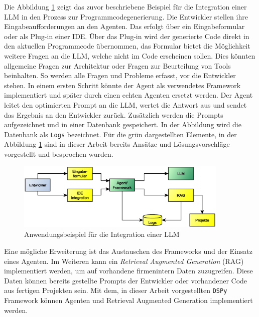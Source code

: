 Die Abbildung \ref{img:example_firm_integration} zeigt das zuvor beschriebene Beispiel für die Integration einer LLM in den Prozess zur Programmcodegenerierung. Die Entwickler stellen ihre Eingabeaufforderungen an den Agenten. Das erfolgt über ein Eingabeformular oder als Plug-in einer IDE. Über das Plug-in wird der generierte Code direkt in den aktuellen Programmcode übernommen, das Formular bietet die Möglichkeit weitere Fragen an die LLM, welche nicht im Code erscheinen sollen. Dies könnten allgemeine Fragen zur Architektur oder Fragen zur Beurteilung von Tools beinhalten. So werden alle Fragen und Probleme erfasst, vor die Entwickler stehen.
In einem ersten Schritt könnte der Agent als verwendetes Framework implementiert und später durch einen echten Agenten ersetzt werden. Der Agent leitet den optimierten Prompt an die LLM, wertet die Antwort aus und sendet das Ergebnis an den Entwickler zurück. Zusätzlich werden die Prompts aufgezeichnet und in einer Datenbank gespeichert. In der Abbildung wird die Datenbank als \texttt{Logs} bezeichnet. Für die grün dargestellten Elemente, in der Abbildung \ref{img:example_firm_integration} sind in dieser Arbeit bereits Ansätze und Lösungsvorschläge vorgestellt und besprochen wurden.\vspace{0.2cm}

\begin{figure}[!ht]
	\includegraphics[width=0.9\textwidth]{content/chapter_discussion/images/anwendungsbeispiel.eps}
	\centering
	\caption{Anwendungsbeispiel für die Integration einer LLM}
	\label{img:example_firm_integration}
\end{figure}

Eine mögliche Erweiterung ist das Austauschen des Frameworks und der Einsatz eines Agenten. Im Weiteren kann ein \textit{Retrieval Augmented Generation} (RAG) implementiert werden, um auf vorhandene firmenintern Daten zuzugreifen. Diese Daten können bereits gestellte Prompts der Entwickler oder vorhandener Code aus fertigen Projekten sein. Mit dem, in dieser Arbeit vorgestellten \texttt{DSPy} Framework können Agenten und Retrieval Augmented Generation implementiert werden.\vspace{0.2cm}

